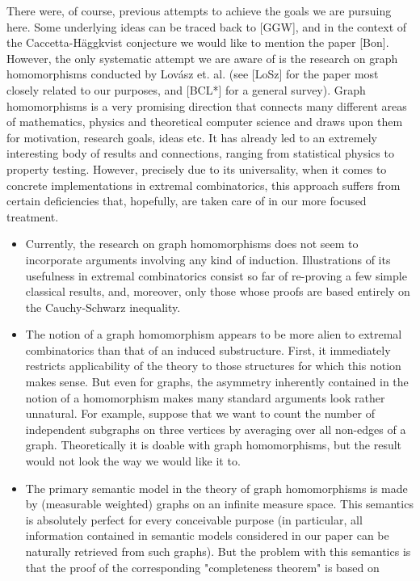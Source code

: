 \documentclass[10pt]{article}
\begin{document}
There were, of course, previous attempts to achieve the goals we are pursuing here. Some underlying ideas can be traced back to [GGW], and in the context of the Caccetta-Häggkvist conjecture we would like to mention the paper [Bon]. However, the only systematic attempt we are aware of is the research on graph homomorphisms conducted by Lovász et. al. (see [LoSz] for the paper most closely related to our purposes, and [BCL*] for a general survey). Graph homomorphisms is a very promising direction that connects many different areas of mathematics, physics and theoretical computer science and draws upon them for motivation, research goals, ideas etc. It has already led to an extremely interesting body of results and connections, ranging from statistical physics to property testing. However, precisely due to its universality, when it comes to concrete implementations in extremal combinatorics, this approach suffers from certain deficiencies that, hopefully, are taken care of in our more focused treatment.

\begin{itemize}
  \item[-] Currently, the research on graph homomorphisms does not seem to incorporate arguments involving any kind of induction. Illustrations of its usefulness in extremal combinatorics consist so far of re-proving a few simple classical results, and, moreover, only those whose proofs are based entirely on the Cauchy-Schwarz inequality.
  \item[-] The notion of a graph homomorphism appears to be more alien to extremal combinatorics than that of an induced substructure. First, it immediately restricts applicability of the theory to those structures for which this notion makes sense. But even for graphs, the asymmetry inherently contained in the notion of a homomorphism makes many standard arguments look rather unnatural. For example, suppose that we want to count the number of independent subgraphs on three vertices by averaging over all non-edges of a graph. Theoretically it is doable with graph homomorphisms, but the result would not look the way we would like it to.
  \item[-] The primary semantic model in the theory of graph homomorphisms is made by (measurable weighted) graphs on an infinite measure space. This semantics is absolutely perfect for every conceivable purpose (in particular, all information contained in semantic models considered in our paper can be naturally retrieved from such graphs). But the problem with this semantics is that the proof of the corresponding "completeness theorem" is based on
\end{itemize}
\end{document}
